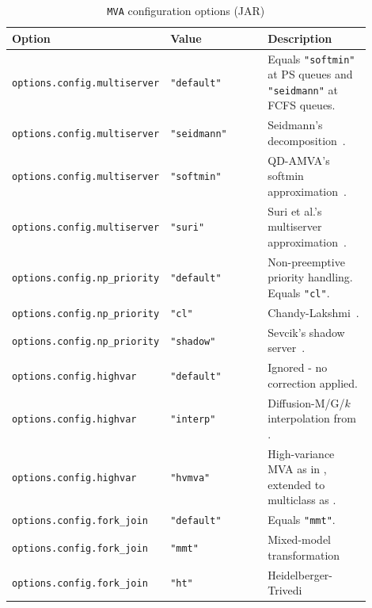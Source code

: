 \begin{JAVA}
{
\begin{table}[thbp]
\footnotesize
\centering
\caption{\texttt{MVA} configuration options (JAR)}
\begin{tabular}{|p{0.3\linewidth}|p{0.3\linewidth}|p{0.3\linewidth}|}
\hline
\textbf{Option} & \textbf{Value} & \textbf{Description}\\
\hline
\texttt{options.config.multiserver} & \texttt{"default"} & Equals \texttt{"softmin"} at PS queues and \texttt{"seidmann"} at FCFS queues.\\
\texttt{options.config.multiserver} & \texttt{"seidmann"} & Seidmann's decomposition~\cite{seidmann1987computerized}.\\
\texttt{options.config.multiserver} & \texttt{"softmin"} & QD-AMVA's softmin approximation~\cite{casale2015qdamva}.\\
\texttt{options.config.multiserver} & \texttt{"suri"} & Suri et al.'s multiserver approximation~\cite{suri2007approximate}.\\
\hline
\texttt{options.config.np\_priority} & \texttt{"default"} & Non-preemptive priority handling. Equals \texttt{"cl"}.\\
\texttt{options.config.np\_priority} & \texttt{"cl"} & Chandy-Lakshmi~\cite{EagL88}.\\
\texttt{options.config.np\_priority} & \texttt{"shadow"} & Sevcik's shadow server~\cite{Sev77}.\\
\hline
\texttt{options.config.highvar} & \texttt{"default"} & Ignored - no correction applied.\\
\texttt{options.config.highvar} & \texttt{"interp"} & Diffusion-M/G/$k$ interpolation from \cite{Casale2020a}.\\
\texttt{options.config.highvar} & \texttt{"hvmva"} & High-variance MVA as in \cite{BonW86}, extended to multiclass as \cite[Eq. 3.21]{Franks1996}.\\
\hline
\texttt{options.config.fork\_join} & \texttt{"default"} & Equals \texttt{"mmt"}. \\
\texttt{options.config.fork\_join} & \texttt{"mmt"} & Mixed-model transformation \cite{dobre24}\\
\texttt{options.config.fork\_join} & \texttt{"ht"} & Heidelberger-Trivedi~\cite{heidelberger1982queueing}\\
\hline
\end{tabular}
\label{TAB_MVA_config_JAR}
\end{table}
}
\end{JAVA}

